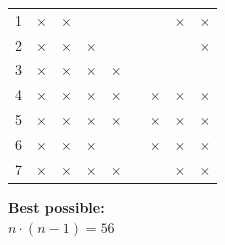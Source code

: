 \documentclass[a4paper, 10pt]{article}
\begin{document}
\begin{itemize}
\begin{itemize}
\begin{figure}[htbp]
\begin{minipage}[b]{0.4\linewidth}
{\begin{tabular}{c | c c c c c c c c}
								1 & $\times$ & $\times$ &          &          &        &          & $\times$ & $\times$ \\
								2 & $\times$ & $\times$ & $\times$ &          &        &          &          & $\times$ \\
								3 & $\times$ & $\times$ & $\times$ & $\times$ &        &          &          &          \\
								4 & $\times$ & $\times$ & $\times$ & $\times$ &        & $\times$ & $\times$ & $\times$ \\
								5 & $\times$ & $\times$ & $\times$ & $\times$ &        & $\times$ & $\times$ & $\times$ \\
								6 & $\times$ & $\times$ & $\times$ &          &        & $\times$ & $\times$ & $\times$ \\
								7 & $\times$ & $\times$ & $\times$ & $\times$ &        &          & $\times$ & $\times$ \\
							\end{tabular}
						}
					\end{minipage}
					\begin{minipage}[b]{0.4\linewidth}
						\vspace{0.3cm}
						\textbf{Best possible:} \\
						$n \cdot (n-1) = 56$ \\
						\vspace{-0.1cm} \\
\end{minipage}
\end{figure}
\end{itemize}
\end{itemize}
\end{document}
